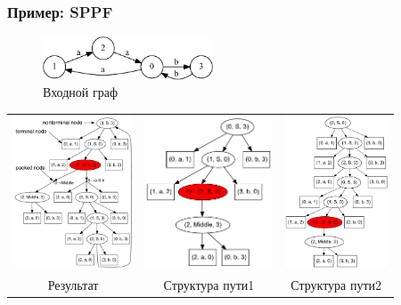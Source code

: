 \documentclass{beamer}
\begin{document}
\begin{frame}[fragile]
  \transwipe[direction=90]
  \frametitle{Пример: SPPF}
\begin{figure}[ht]
    \centering
        \includegraphics[width=0.45\textwidth]{pictures/input.pdf}
        \caption{Входной граф}
\end{figure}

\begin{tabular}{  c  c  c  }
      \includegraphics[height=4.5cm]{pictures/AnBn.pdf}
    &
      \includegraphics[height=4.5cm]{pictures/AnBn_2.pdf}
    &
      \includegraphics[height=4.5cm]{pictures/AnBn_1.pdf}

\\
Результат
& Структура пути1 
& Структура пути2
  \end{tabular}
\end{frame}
\end{document}
